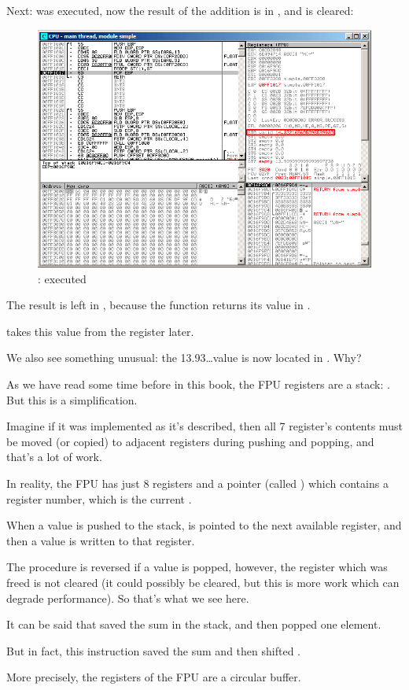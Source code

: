 \clearpage
Next: \FADDP was executed, now the result of the addition is in , and  is cleared:

\begin{figure}[H]
\centering
\includegraphics[scale=\FigScale]{patterns/12_FPU/1_simple/olly5.png}
\caption{\olly: \FADDP executed}
\label{fig:FPU_simple_olly_5}
\end{figure}

The result is left in , because the function returns its value in .

\main takes this value from the register later.

We also see something unusual: the 13.93\ldots value is now located in .
Why?

\label{FPU_is_rather_circular_buffer}

As we have read some time before in this book, the \ac{FPU} registers are a stack: . 
But this is a simplification.

Imagine if it was implemented  as it's described, then all 7 register's
contents must be moved (or copied) to adjacent registers during pushing and popping, 
and that's a lot of work.

In reality, the \ac{FPU} has just 8 registers and a pointer (called ) which contains a register number,
which is the current .

When a value is pushed to the stack,  is pointed to the next available register,
and then a value is written to that register.

The procedure is reversed if a value is popped, however, the register which was freed is not cleared
(it could possibly be cleared, but this is more work which can degrade performance).
So that's what we see here. 

It can be said that \FADDP saved the sum in the stack, and then popped one element.

But in fact, this instruction saved the sum and then shifted .

More precisely, the registers of the \ac{FPU} are a circular buffer.
